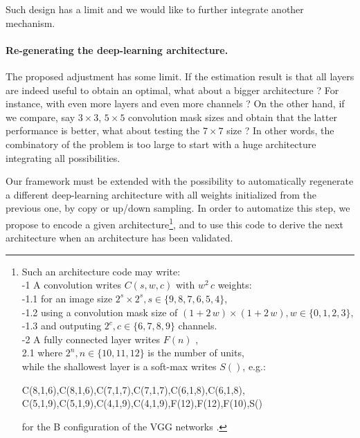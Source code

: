 \documentclass[twocolumn]{article}
\begin{document}
Such design has a limit and we would like to further integrate another mechanism.

\paragraph*{Re-generating the deep-learning architecture.}

The proposed adjustment has some limit. If the estimation result is that all layers are indeed useful to obtain an optimal, what about a bigger architecture ? For instance, with even more layers and even more channels ? On the other hand, if we compare, say $3 \times 3$, $5 \times 5$ convolution mask sizes and obtain that the latter performance is better, what about testing the $7 \times 7$ size ? In other words, the combinatory of the problem is too large to start with a huge architecture integrating all possibilities.

Our framework must be extended with the possibility to automatically regenerate a different deep-learning architecture with all weights initialized from the previous one, by copy or up/down sampling. In order to automatize this step, we propose to encode a given architecture\footnote{Such an architecture code may write:
\\-1 A convolution writes $C(s,w,c)$ with $w^2\,c$ weights:
\\-1.1 for an image size $2^s \times 2^s, s \in \{9, 8, 7, 6, 5, 4\}$,
\\-1.2 using a convolution mask size of $(1+2\,w)\times (1+2\,w), w \in \{0, 1, 2, 3\}$,
\\-1.3 and outputing $2^c, c \in \{6, 7, 8, 9\}$ channels.
\\-2 A fully connected layer writes $F(n)$ ,
\\ 2.1 where $2^n, n \in \{10, 11, 12\}$ is the number of units,
\\ while the shallowest layer is a soft-max writes $S()$, e.g.:
\begin{center}{\scriptsize  
C(8,1,6),C(8,1,6),C(7,1,7),C(7,1,7),C(6,1,8),C(6,1,8),\\
C(5,1,9),C(5,1,9),C(4,1,9),C(4,1,9),F(12),F(12),F(10),S()}
\end{center}
for the B configuration of the VGG networks \cite{Simonyan2015Very}.}, and to use this code to derive the next architecture when an architecture has been validated.
\end{document}
